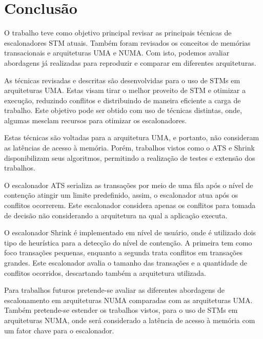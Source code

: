 \documentclass[ti]{texufpel}
\begin{document}
\chapter{Conclusão}

O trabalho teve como objetivo principal revisar as principais técnicas de escalonadores STM atuais. Também foram revisados os conceitos de memórias transacionais e arquiteturas UMA e NUMA. Com isto, podemos avaliar abordagens já realizadas para reproduzir e comparar em diferentes arquiteturas.

As técnicas revisadas e descritas são desenvolvidas para o uso de STMs em arquiteturas UMA. Estas visam tirar o melhor proveito de STM e otimizar a execução, reduzindo conflitos e distribuindo de maneira eficiente a carga de trabalho. Este objetivo pode ser obtido com uso de técnicas distintas, onde, algumas mesclam recursos para otimizar os escalonadores.

Estas técnicas são voltadas para a arquitetura UMA, e portanto, não consideram as latências de acesso à memória. Porém, trabalhos vistos como o ATS e Shrink disponibilizam seus algoritmos, permitindo a realização de testes e extensão dos trabalhos.

O escalonador ATS serializa as transações por meio de uma fila após o nível de contenção atingir um limite predefinido, assim, o escalonador atua após os conflitos ocorrerem. Este escalonador considera apenas os conflitos para tomada de decisão não considerando a arquitetura na qual a aplicação executa.

O escalonador Shrink é implementado em nível de usuário, onde é utilizado dois tipo de heurística para a detecção do nível de contenção. A primeira tem como foco transações pequenas, enquanto a segunda trata conflitos em transações grandes. Este escalonador avalia o tamanho das transações e a quantidade de conflitos ocorridos, descartando também a arquitetura utilizada.

Para trabalhos futuros pretende-se avaliar as diferentes abordagens de escalonamento em arquiteturas NUMA comparadas com as arquiteturas UMA. Também pretende-se estender os trabalhos vistos, para o uso de STMs em arquiteturas NUMA, onde será considerado a latência de acesso à memória com um fator chave para o escalonador.



\end{document}
